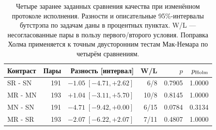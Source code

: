 \begin{table}[htbp]\centering\small
\caption{Четыре заранее заданных сравнения качества при изменённом протоколе исполнения. Разности и описательные 95\%-интервалы бутстрэпа по задачам даны в процентных пунктах. W/L --- несогласованные пары в пользу первого/второго условия. Поправка Холма применяется к точным двусторонним тестам Мак-Немара по четырём сравнениям.}\label{tab:heldout-tests}
\begin{tabular}{lrrrrr}\toprule
Контраст & Пары & Разность [интервал] & W/L & $p$ & $p_{\rm Holm}$\\
\midrule
SR - SN & 191 & $-1.05\;[-4.71,+2.62]$ & 6/8 & 0.7905 & 1.0000\\
MR - MN & 193 & $+1.04\;[-3.11,+5.70]$ & 10/8 & 0.8145 & 1.0000\\
MN - SN & 191 & $-4.71\;[-9.42,+0.00]$ & 6/15 & 0.0784 & 0.3134\\
MR - SR & 193 & $-2.07\;[-6.22,+2.07]$ & 7/11 & 0.4807 & 1.0000\\
\bottomrule\end{tabular}\end{table}
